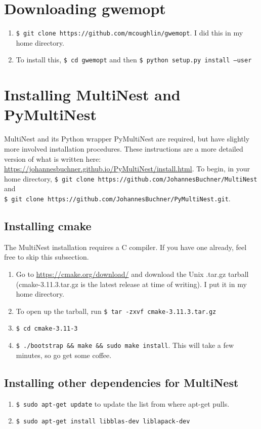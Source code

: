\documentclass[11pt]{article}
\begin{document}
\section{Downloading gwemopt}
\begin{enumerate}
	\item {\tt \$ git clone https://github.com/mcoughlin/gwemopt}. I did this in my home directory.
	\item To install this, {\tt \$ cd gwemopt} and then {\tt \$ python setup.py install --user}
\end{enumerate}

\section{Installing MultiNest and PyMultiNest}
MultiNest and its Python wrapper PyMultiNest are required, but have slightly more involved installation procedures. These instructions are a more detailed version of what is written here: \url{https://johannesbuchner.github.io/PyMultiNest/install.html}. To begin, in your home directory, {\tt \$ git clone https://github.com/JohannesBuchner/MultiNest} and \\{\tt \$ git clone https://github.com/JohannesBuchner/PyMultiNest.git}.

\subsection{Installing cmake}
The MultiNest installation requires a C compiler. If you have one already, feel free to skip this subsection.
\begin{enumerate}
	\item Go to \url{https://cmake.org/download/} and download the Unix .tar.gz tarball (cmake-3.11.3.tar.gz is the latest release at time of writing). I put it in my home directory.
	\item To open up the tarball, run {\tt \$ tar -zxvf cmake-3.11.3.tar.gz}
	\item {\tt \$ cd cmake-3.11-3}
	\item {\tt \$ ./bootstrap \&\& make \&\& sudo make install}. This will take a few minutes, so go get some coffee.
\end{enumerate}

\subsection{Installing other dependencies for MultiNest}
\begin{enumerate}
	\item {\tt \$ sudo apt-get update} to update the list from where apt-get pulls.
	\item {\tt \$ sudo apt-get install libblas-dev liblapack-dev}
\end{enumerate}
\end{document}
